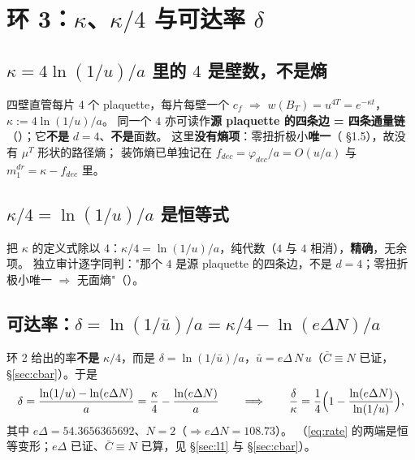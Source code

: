 \section{环 3：$\kappa$、$\kappa/4$ 与可达率 $\delta$}\label{sec:delta}

\subsection{$\kappa=4\ln(1/u)/a$ 里的 $4$ 是壁数，不是熵}

四壁直管每片 4 个 plaquette，每片每壁一个 $c_f$ $\Rightarrow$ $w(B_T)=u^{4T}=e^{-\kappa t}$，$\kappa:=4\ln(1/u)/a$。
同一个 $4$ 亦可读作\textbf{源 plaquette 的四条边 = 四条通量链}（）；它\textbf{不是} $d=4$、\textbf{不是}面数。
这里\textbf{没有熵项}：零扭折极小\textbf{唯一}（ \S1.5），故没有 $\mu^T$ 形状的路径熵；
装饰熵已单独记在 $f_{dec}=\varphi_{dec}/a=O(u/a)$ 与 $m_1^{dr}=\kappa-f_{dec}$ 里。\LT
{}

\subsection{$\kappa/4=\ln(1/u)/a$ 是恒等式}

把 $\kappa$ 的定义式除以 4：$\kappa/4=\ln(1/u)/a$，纯代数（$4$ 与 $4$ 相消），\textbf{精确}，无余项。\LT
独立审计逐字同判："那个 $4$ 是源 plaquette 的四条边，不是 $d=4$；零扭折极小唯一 $\Rightarrow$ 无面熵"（）。

\subsection{可达率：$\delta=\ln(1/\bar u)/a=\kappa/4-\ln(e\Delta N)/a$}

环 2 给出的率\textbf{不是} $\kappa/4$，而是 $\delta=\ln(1/\bar u)/a$，$\bar u=e\Delta\,N\,u$（$\bar C\equiv N$ 已证，\S\ref{sec:cbar}）。于是
\begin{equation}
\delta=\frac{\ln(1/u)-\ln(e\Delta N)}{a}=\frac{\kappa}{4}-\frac{\ln(e\Delta N)}{a}
\qquad\Longrightarrow\qquad
\frac{\delta}{\kappa}=\frac14\Bigl(1-\frac{\ln(e\Delta N)}{\ln(1/u)}\Bigr),
\label{eq:rate}
\end{equation}
其中 $e\Delta=54.3656365692$、$N=2$（$\Rightarrow e\Delta N=108.73$）。
\LT{}（\eqref{eq:rate} 的两端是恒等变形；$e\Delta$ 已证、$\bar C\equiv N$ 已算，见 \S\ref{sec:l1} 与 \S\ref{sec:cbar}）。

